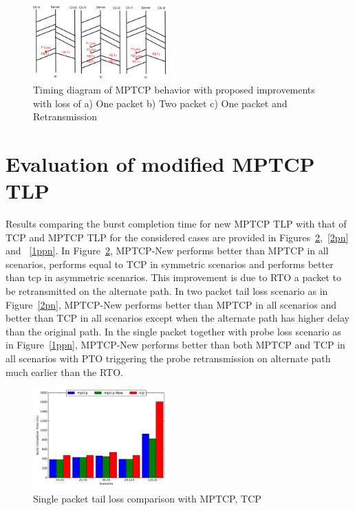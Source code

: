 \documentclass[10pt,conference,compsoc]{IEEEtran}
\begin{document}
\begin{figure}[!ht]
\begin{center}
\includegraphics[angle=0, width=0.46\textwidth]{images/timingER3NewTLP.pdf}
\end{center}
\caption{Timing diagram of MPTCP behavior with proposed improvements with loss of a) One packet b) Two packet c) One packet and Retransmission}\label{timingNew}
\end{figure}


\section{Evaluation of modified MPTCP TLP}\label{eval}


Results comparing the burst completion time for new MPTCP TLP with that of TCP and MPTCP TLP for the considered cases are provided in Figures~\ref{1pn},~\ref{2pn} and ~\ref{1ppn}. 
In Figure~\ref{1pn}, MPTCP-New performs better than MPTCP in all scenarios, performs equal to TCP in symmetric scenarios and performs better than tcp in asymmetric scenarios. This improvement is due to RTO a packet to be retransmitted on the alternate path. In two packet tail loss scenario as in Figure~\ref{2pn}, MPTCP-New performs better than MPTCP in all scenarios and better than TCP in all scenarios except when the alternate path has higher delay than the original path. In the single packet together with probe loss scenario as in Figure~\ref{1ppn}, MPTCP-New performs better than both MPTCP and TCP in all scenarios with PTO triggering the probe retransmission on alternate path much earlier than the RTO.


\begin{figure}[!ht]
\begin{center}
\includegraphics[angle=0, width=0.46\textwidth, natwidth=578.16,natheight=433.62]{plots/1PNew.pdf}
\caption{Single packet tail loss comparison with MPTCP, TCP}\label{1pn}
\end{center}
\end{figure}
\end{document}
